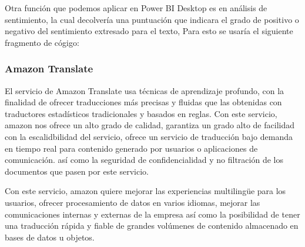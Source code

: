 \documentclass[english,runningheads,a4paper]{llncs}[2018/03/10]
\begin{document}
    Otra función que podemos aplicar en Power BI Desktop es en análisis de 
    sentimiento, la cual decolvería una puntuación que indicara el grado de 
    positivo o negativo del sentimiento extresado para el texto, Para esto se 
    usaría el siguiente fragmento de cógigo:
    \subsubsection{Amazon Translate}
    El servicio de Amazon Translate usa técnicas de aprendizaje profundo, con 
    la finalidad de ofrecer traducciones más precisas y fluidas que las 
    obtenidas con traductores estadísticos tradicionales y basados en reglas.
    Con este servicio, amazon nos ofrece un alto grado de calidad, garantiza un 
    grado alto de facilidad con la escalidbilidad del servicio, ofrece un 
    servicio de traducción bajo demanda en tiempo real para contenido generado 
    por usuarios o aplicaciones de comunicación. así como la seguridad de 
    confidencialidad y no filtración de los documentos que pasen por este 
    servicio.
    
    Con este servicio, amazon quiere mejorar las experiencias multilingüe para 
    los usuarios, ofrecer procesamiento de datos en varios idiomas, mejorar las 
    comunicaciones internas y externas de la empresa así como la posibilidad de 
    tener una traducción rápida y fiable de grandes volúmenes de contenido 
    almacenado en bases de datos u objetos.
    
\end{document}

